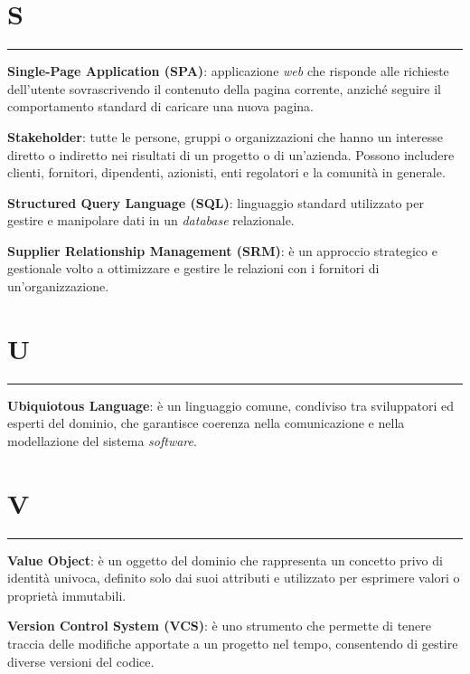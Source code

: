 \section*{S}
{\color{lightgray}\rule{\textwidth}{0.4pt}} %
\begin{glossaryitemize}
    \item \textbf{Single-Page Application (SPA)}: applicazione \textit{web} che risponde alle richieste dell’utente sovrascrivendo il contenuto della pagina corrente, anziché seguire il comportamento standard di caricare una nuova pagina.
    \item \textbf{Stakeholder}: tutte le persone, gruppi o organizzazioni che hanno un interesse diretto o indiretto nei risultati di un progetto o di un'azienda. Possono includere clienti, fornitori, dipendenti, azionisti, enti regolatori e la comunità in generale.
    \item \textbf{Structured Query Language (SQL)}: linguaggio standard utilizzato per gestire e manipolare dati in un \textit{database} relazionale.
    \item \textbf{Supplier Relationship Management (SRM)}: è un approccio strategico e gestionale volto a ottimizzare e gestire le relazioni con i fornitori di un'organizzazione.
\end{glossaryitemize}

\section*{U}
{\color{lightgray}\rule{\textwidth}{0.4pt}} %
\begin{glossaryitemize}
    \item \textbf{Ubiquiotous Language}: è un linguaggio comune, condiviso tra sviluppatori ed esperti del dominio, che garantisce coerenza nella comunicazione e nella modellazione del sistema \textit{software}.
\end{glossaryitemize}

\section*{V}
{\color{lightgray}\rule{\textwidth}{0.4pt}} %
\begin{glossaryitemize}
    \item \textbf{Value Object}: è un oggetto del dominio che rappresenta un concetto privo di identità univoca, definito solo dai suoi attributi e utilizzato per esprimere valori o proprietà immutabili.
    \item \textbf{Version Control System (VCS)}: è uno strumento che permette di tenere traccia delle modifiche apportate a un progetto nel tempo, consentendo di gestire diverse versioni del codice.
\end{glossaryitemize}



